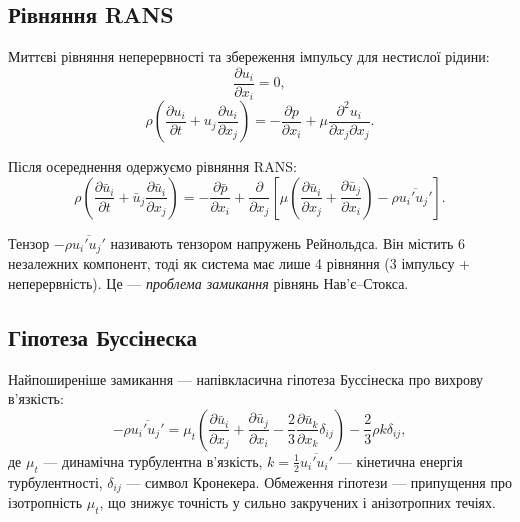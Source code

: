 \documentclass[14pt,a4paper,extarticle]{extarticle}
\begin{document}
\subsection{Рівняння RANS}

Миттєві рівняння неперервності та збереження імпульсу для нестислої рідини:
\begin{equation}
  \frac{\partial u_i}{\partial x_i} = 0,
  \label{eq:continuity}
\end{equation}
\begin{equation}
  \rho \left( \frac{\partial u_i}{\partial t} + u_j \frac{\partial u_i}{\partial x_j} \right)
  = -\frac{\partial p}{\partial x_i} + \mu \frac{\partial^2 u_i}{\partial x_j \partial x_j}.
  \label{eq:ns-instant}
\end{equation}

Після осереднення одержуємо рівняння RANS:
\begin{equation}
  \rho \left( \frac{\partial \bar{u}_i}{\partial t} + \bar{u}_j \frac{\partial \bar{u}_i}{\partial x_j} \right)
  = -\frac{\partial \bar{p}}{\partial x_i}
  + \frac{\partial}{\partial x_j} \left[
      \mu \left( \frac{\partial \bar{u}_i}{\partial x_j} + \frac{\partial \bar{u}_j}{\partial x_i} \right)
      - \rho \overline{u_i' u_j'}
    \right].
  \label{eq:rans}
\end{equation}

Тензор $-\rho \overline{u_i' u_j'}$ називають тензором напружень Рейнольдса.
Він містить 6 незалежних компонент, тоді як система має лише 4 рівняння
(3 імпульсу + неперервність). Це --- \emph{проблема замикання} рівнянь
Нав'є--Стокса.

\subsection{Гіпотеза Буссінеска}

Найпоширеніше замикання --- напівкласична гіпотеза Буссінеска про вихрову
в'язкість:
\begin{equation}
  -\rho \overline{u_i' u_j'} = \mu_t \left( \frac{\partial \bar{u}_i}{\partial x_j}
    + \frac{\partial \bar{u}_j}{\partial x_i}
    - \frac{2}{3} \frac{\partial \bar{u}_k}{\partial x_k} \delta_{ij} \right)
    - \frac{2}{3} \rho k \delta_{ij},
  \label{eq:boussinesq}
\end{equation}
де $\mu_t$ --- динамічна турбулентна в'язкість,
$k = \tfrac{1}{2} \overline{u_i' u_i'}$ --- кінетична енергія турбулентності,
$\delta_{ij}$ --- символ Кронекера. Обмеження гіпотези --- припущення про
ізотропність $\mu_t$, що знижує точність у сильно закручених і анізотропних
течіях.
\end{document}
